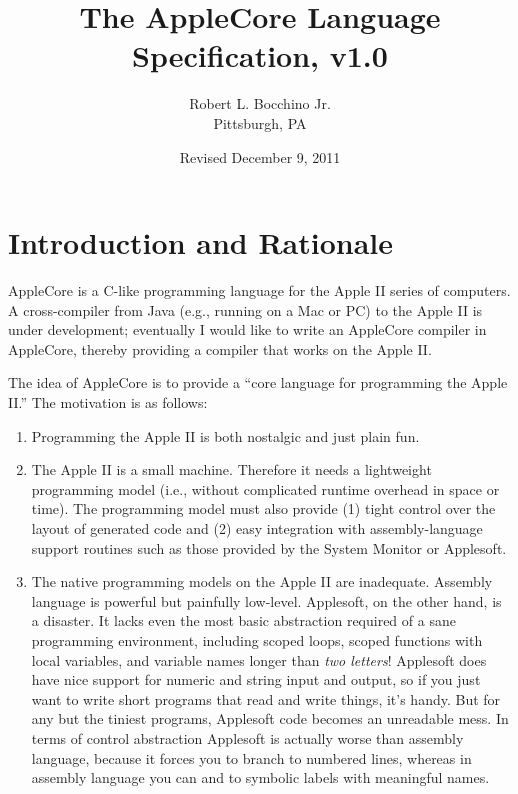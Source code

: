 \documentclass[10pt]{article}
\begin{document}
\title{\bfseries{The AppleCore Language Specification, v1.0}}
%
\author{Robert L. Bocchino Jr.\\
Pittsburgh, PA}
%
\date{Revised December 9, 2011}

\maketitle

\section{Introduction and Rationale}

AppleCore is a C-like programming language for the Apple II series of
computers.  A cross-compiler from Java (e.g., running on a Mac or PC)
to the Apple II is under development; eventually I would like to write
an AppleCore compiler in AppleCore, thereby providing a compiler that
works on the Apple II.

The idea of AppleCore is to provide a ``core language for programming
the Apple II.''  The motivation is as follows:
%
\begin{enumerate}
%
\item Programming the Apple II is both nostalgic and just plain fun.
%
\item The Apple II is a small machine.  Therefore it needs a
  lightweight programming model (i.e., without complicated runtime
  overhead in space or time).  The programming model must also provide
  (1) tight control over the layout of generated code and (2) easy
  integration with assembly-language support routines such as those
  provided by the System Monitor or Applesoft.
%
\item The native programming models on the Apple II are inadequate.
  Assembly language is powerful but painfully low-level.  Applesoft,
  on the other hand, is a disaster.  It lacks even the most basic
  abstraction required of a sane programming environment, including
  scoped loops, scoped functions with local variables, and variable
  names longer than \emph{two letters}!  Applesoft does have nice
  support for numeric and string input and output, so if you just want
  to write short programs that read and write things, it's handy. But
  for any but the tiniest programs, Applesoft code becomes an
  unreadable mess.  In terms of control abstraction Applesoft is
  actually worse than assembly language, because it forces you to
  branch to numbered lines, whereas in assembly language you can
   and  to symbolic labels with meaningful names.
%
\end{enumerate}
\end{document}
